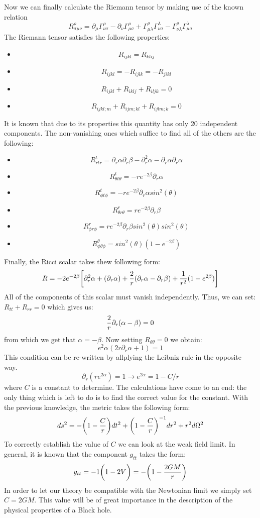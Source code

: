 \documentclass[]{article}
\theoremstyle{definition}
\theoremstyle{Theorem}
\theoremstyle{definition}
\theoremstyle{definition}
\theoremstyle{definition}
\begin{document}
Now we can finally calculate the Riemann tensor by making use of the known relation 
$$R^\rho_{\sigma\mu\nu}=\partial_\mu\Gamma^\rho_{\nu\sigma}-\partial_\nu\Gamma^\rho_{\mu\sigma}+\Gamma^\rho_{\mu\lambda}\Gamma^\lambda_{\nu\sigma}-\Gamma^\rho_{\nu\lambda}\Gamma^\lambda_{\mu\sigma}$$ 
The Riemann tensor satisfies the following properties:
\begin{itemize}
	\item $$R_{ijkl}=R_{klij}$$
	\item $$R_{ijkl}=-R_{ijlk}=-R_{jikl}$$
	\item $$R_{ijkl}+R_{iklj}+R_{iljk}=0$$
	\item $$R_{ijkl;m}+R_{ijm;kl}+R_{ijlm;k}=0$$
\end{itemize}
It is known that due to its properties this quantity has only 20 independent components. The non-vanishing ones which suffice to find all of the others are the following:
\begin{itemize}
	\item $$R^{t}_{rtr}=\partial_r\alpha\partial_r\beta-\partial_r^2\alpha-\partial_r\alpha\partial_r\alpha$$
	\item $$R^{t}_{\theta t\theta}=-re^{-2\beta}\partial_r\alpha$$
	\item $$R^{t}_{\phi t\phi}=-re^{-2\beta}\partial_r\alpha sin^2(\theta)$$
	\item $$R^{r}_{\theta r\theta}=re^{-2\beta}\partial_r\beta$$
	\item $$R^{r}_{\phi r\phi }=re^{-2\beta}\partial_r\beta sin^2(\theta)sin^2(\theta)$$
	\item $$R^{\theta}_{\phi\theta\phi}=sin^2(\theta)(1-e^{-2\beta})$$
\end{itemize}
Finally, the Ricci scalar takes thew following form:
$$R=-2e^{-2\beta}\bigg[\partial_r^2\alpha+(\partial_r\alpha)+{2\over r}(\partial_r\alpha-\partial_r\beta)+{1\over r^2}(1-e^{2\beta})\bigg]$$
All of the components of this scalar must vanish independently. Thus, we can set: $R_{tt}+R_{rr}=0$ which gives us:
$${2\over r}\partial_r (\alpha-\beta)=0$$ 
from which we get that $\alpha=-\beta$. Now setting $R_{\theta\theta}=0$ we obtain:
$$e^2\alpha(2r\partial_r\alpha+1)=1$$
This condition can be re-written by allplying the Leibniz rule in the opposite way.
$$\partial_r(re^{2\alpha})=1\longrightarrow e^{2\alpha}=1-{C/r}$$
where $C$ is a constant to determine. The calculations have come to an end: the only thing which is left to do is to find the correct value for the constant. With the previous knowledge, the metric takes the following form:
$$ds^2=-\bigg(1-{C\over r}\bigg)dt^2+\bigg(1-{C\over r}\bigg)^{-1}dr^2+r^2d\Omega^2$$
To correctly establish the value of $C$ we can look at the weak field limit. In general, it is known that the component $g_{tt}$ takes the form:
$$g_{tt}=-1\bigg(1-2V\bigg)=-\bigg(1-{2GM\over r}\bigg)$$
In order to let our theory be compatible with the Newtonian limit we simply set $C=2GM$. This value will be of great importance in the description of the physical properties of a Black hole.
\end{document}
